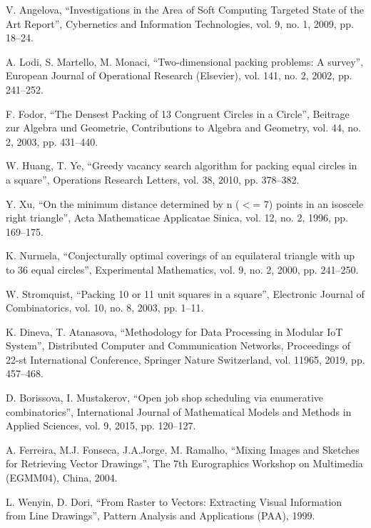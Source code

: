 \documentclass[conference]{IEEEtran}
\begin{document}
\begin{thebibliography}{00}

 V. Angelova, ``Investigations in the Area of Soft Computing Targeted State of the Art Report'', Cybernetics and Information Technologies, vol. 9, no. 1, 2009, pp. 18--24.

 A. Lodi, S. Martello, M. Monaci, ``Two-dimensional packing problems: A survey'', European Journal of Operational Research (Elsevier), vol. 141, no. 2, 2002, pp. 241--252.

 F. Fodor, ``The Densest Packing of 13 Congruent Circles in a Circle'', Beitrage zur Algebra und Geometrie, Contributions to Algebra and Geometry, vol. 44, no. 2, 2003, pp. 431--440.

 W. Huang, T. Ye, ``Greedy vacancy search algorithm for packing equal circles in a square'', Operations Research Letters, vol. 38, 2010, pp. 378--382.

 Y. Xu, ``On the minimum distance determined by n ($<$= 7) points in an isoscele right triangle'', Acta Mathematicae Applicatae Sinica, vol. 12, no. 2, 1996, pp. 169--175.

 K. Nurmela, ``Conjecturally optimal coverings of an equilateral triangle with up to 36 equal circles'', Experimental Mathematics, vol. 9, no. 2, 2000, pp. 241--250.

 W. Stromquist, ``Packing 10 or 11 unit squares in a square'', Electronic Journal of Combinatorics, vol. 10, no. 8, 2003, pp. 1--11.

 K. Dineva, T. Atanasova, ``Methodology for Data Processing in Modular IoT System'', Distributed Computer and Communication Networks, Proceedings of 22-st International Conference, Springer Nature Switzerland, vol. 11965, 2019, pp. 457--468.

 D. Borissova, I. Mustakerov, ``Open job shop scheduling via enumerative combinatorics'', International Journal of Mathematical Models and Methods in Applied Sciences, vol. 9, 2015, pp. 120--127.

 A. Ferreira, M.J. Fonseca, J.A.Jorge, M. Ramalho, ``Mixing Images and Sketches for Retrieving Vector Drawings'', The 7th Eurographics Workshop on Multimedia (EGMM04), China, 2004.

 L. Wenyin, D. Dori, ``From Raster to Vectors: Extracting Visual Information from Line Drawings'', Pattern Analysis and Applications (PAA), 1999.


\end{thebibliography}
\end{document}
